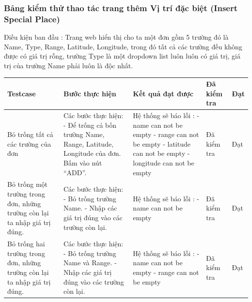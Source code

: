 \documentclass{article}
\begin{document}
\subsubsection{Bảng kiểm thử thao tác trang thêm Vị trí đặc biệt (Insert Special Place) }
Điều kiện ban đầu : Trang web hiển thị cho ta một đơn gồm 5 trường đó là Name, Type, Range, Latitude, Longitude, trong đó tất cả các trường đều không được có giá trị rỗng, trường Type là một dropdown list luôn luôn có giá trị, giá trị của trường Name phải luôn là độc nhất.

\begin{longtable}{ | p{} |p{} | p{}  | p{}  | p{}  | } 
\hline
\textbf{Testcase}& \textbf{Bước thực hiện}& \textbf{Kết quả đạt được} & \textbf{Đã kiểm tra}& \textbf{Đạt} \\ 
\hline
\hline
Bỏ trống tất cả các trường của đơn &
Các bước thực hiện: \newline
- Để trống cả bốn trường Name, Range, Latitude, Longitude của đơn. \newline
Bấm vào nút “ADD”.
&
Hệ thống sẽ báo lỗi : \newline
- name can not be empty \newline
- range can not be empty \newline
- latitude can not be empty \newline
- longitude can not be empty \newline
&
Đã kiểm tra &
Đạt \\

\hline
Bỏ trống một trường trong đơn, những trường còn lại ta nhập giá trị đúng. &
Các bước thực hiện: \newline
- Bỏ trống trường Name. \newline
- Nhập các giá trị đúng vào các trường còn lại. \newline 
&
Hệ thống sẽ báo lỗi : \newline
- name can not be empty
&
Đã kiểm tra &
Đạt \\

\hline
Bỏ trống hai trường trong đơn, những trường còn lại ta nhập giá trị đúng. &
Các bước thực hiện: \newline
- Bỏ trống trường Name và Range.  \newline
- Nhập các giá trị đúng vào các trường còn lại. \newline 
&
Hệ thống sẽ báo lỗi : \newline
- name can not be empty \newline
- range can not be empty
&
Đã kiểm tra &
Đạt \\


\end{longtable}
\end{document}
